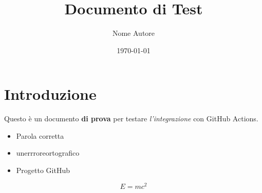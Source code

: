\documentclass{article}
\title{Documento di Test}
\author{Nome Autore}
\date{\today}
\begin{document}
\maketitle

\section{Introduzione}
Questo è un documento \textbf{di prova} per testare \textit{l'integrazione} con GitHub Actions.


\begin{itemize}
    \item Parola corretta
    \item unerrroreortografico
    \item Progetto GitHub
\end{itemize}

\[ E = mc^2 \] %
\end{document}
